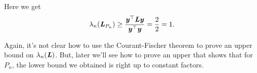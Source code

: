 Here we get
\begin{align*}
\lambda_n(\boldsymbol{\mathit{L}}_{P_n}) \geq \frac{ \boldsymbol{\mathit{y}}^\top \boldsymbol{\mathit{L}} \boldsymbol{\mathit{y}}}{ \boldsymbol{\mathit{y}}^\top \boldsymbol{\mathit{y}}} = \frac{2}{2} = 1.
\end{align*}

Again, it's not clear how to use the Courant-Fischer theorem to prove
an upper bound on $\lambda_n(\boldsymbol{\mathit{L}}) $.
But, later we'll see how to prove an upper that shows that
for $P_n$, the lower bound we obtained is right up to constant factors.




